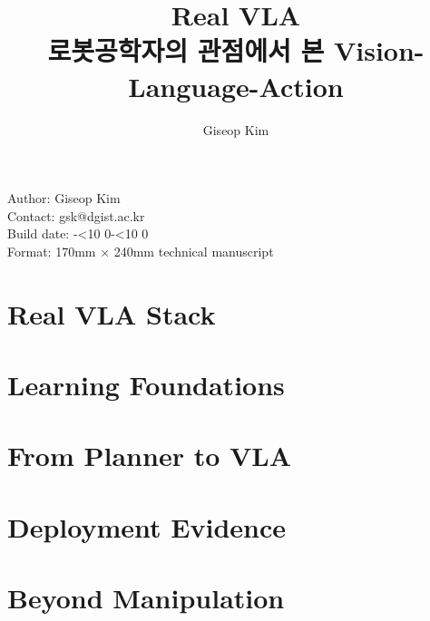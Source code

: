 \documentclass[11pt,oneside,openany]{oblivoir}
\title{\sffamily\bfseries Real VLA\\{\Large 로봇공학자의 관점에서 본 Vision-Language-Action}}
\author{Giseop Kim}
\date{}
\numberwithin{section}{chapter}
\numberwithin{subsection}{section}
\numberwithin{equation}{chapter}
\newcounter{rvlatocpart}
\newcounter{rvlatocchapter}
\newcommand{\twodigits}[1]{\ifnum#1<10 0\fi\number#1}
\newcommand{\builddate}{\number\year-\twodigits{\month}-\twodigits{\day}}
\begin{document}
\frontmatter
\maketitle
\clearpage
\thispagestyle{empty}
\vspace*{\fill}
{\sffamily\small
\noindent Author: Giseop Kim\\
\noindent Contact: gsk@dgist.ac.kr\\
\noindent Build date: \builddate\\
\noindent Format: 170mm $\times$ 240mm technical manuscript
}
\clearpage

\clearpage
\makeatletter
\begingroup
\hypersetup{linkcolor=rvlaBlue}
\pagestyle{rvlatoc}
\setcounter{rvlatocpart}{0}
\setcounter{rvlatocchapter}{-1}
{\let\addcontentsline\@gobblethree\tableofcontents}
\clearpage
\endgroup
\pagestyle{fancy}
\makeatother

\mainmatter
\setcounter{chapter}{-1}

\clearpage
\part{Real VLA Stack}

\clearpage

\clearpage

\clearpage

\clearpage

\clearpage
\part{Learning Foundations}

\clearpage

\clearpage

\clearpage

\clearpage
\part{From Planner to VLA}

\clearpage

\clearpage

\clearpage

\clearpage

\clearpage

\clearpage
\part{Deployment Evidence}

\clearpage

\clearpage

\clearpage

\clearpage
\part{Beyond Manipulation}

\clearpage

\clearpage

\clearpage
\end{document}

